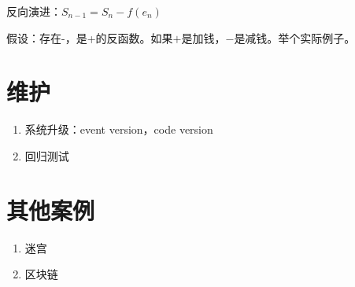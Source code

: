 反向演进：$S_{n-1} = S_n - f(e_n)$

假设：存在-，是+的反函数。如果$+$是加钱，$-$是减钱。举个实际例子。

\section{维护}
\begin{enumerate}
    \item 系统升级：event version，code version
    \item 回归测试
\end{enumerate}

\section{其他案例}
\begin{enumerate}
    \item 迷宫
    \item 区块链
\end{enumerate}




